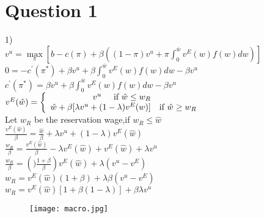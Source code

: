 \documentclass[11pt]{article}
\begin{document}
                             
  \section{Question 1}              
 
 1)\\
 $v^{u}=\max  \limits_{\pi} \left[ b-c(\pi)+\beta((1-\pi)v^{u}+\pi \int_{0}^{\bar{w}}v^{E}(w)f(w)dw) \right]$  \\
 
 
$0=-c^{\prime}(\pi^{*})+\beta v^{u}+\beta \int_{0}^{\bar{w}}v^{E}(w)f(w)dw-\beta v^{u}$ \\
  
$c^{\prime}(\pi^{*})=\beta v^{u}+\beta \int_{0}^{\bar{w}}v^{E}(w)f(w)dw-\beta v^{u}$\\

$v^{E}(\hat{w}) = \left\{ \begin{array}{rcl}
v^{u}   \mbox{\hspace{5mm}if  $\hat{w} \leq w_{R}$}
& \\ \hat{w} +\beta[\lambda v^{u}+(1-\lambda)v^{E}(w)]& \mbox{if $\hat{w} \geq w_{R}$} &\\

\end{array}\right.$\\

Let $w_{R}$ be the reservation wage,if $w_{R} \leq \hat{w}$\\

$\frac{v^{E}(\hat{w})}{\beta}=\frac{\hat{w}}{\beta}+\lambda 
v^{u}+(1-\lambda)v^{E}(\hat{w})$\\

$\frac{w_R}{\beta}=\frac{v^{E}(\hat{w})}{\beta}-\lambda v^{E}(\hat{w})+v^{E}(\hat{w})+\lambda 
v^{u}$\\

$\frac{w_{R}}{\beta}=\left()\frac{1+\beta}{\beta} 
\right)v^{E}(\hat{w})+\lambda(v^{u}-v^{E})$\\

$w_{R}=v^{E}(\hat{w})(1+\beta)+\lambda\beta(v^{u}-v^{E})$\\

$w_{R}=v^{E}(\hat{w})[1+\beta(1-\lambda)]+\beta\lambda v^{u}$\\

\begin{figure}[ht!]
\centering
\texttt{[image: macro.jpg]}
\end{figure}                           
\end{document}
